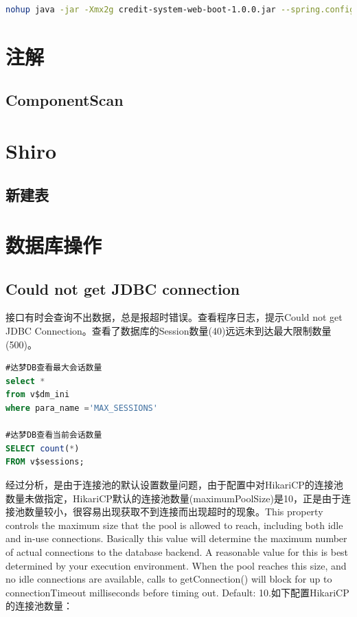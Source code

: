 \documentclass[letter]{book}
\begin{document}
\begin{lstlisting}[language=Bash]
nohup java -jar -Xmx2g credit-system-web-boot-1.0.0.jar --spring.config.location=application-jenkins.properties &
\end{lstlisting}

\section{注解}

\subsection{ComponentScan}

\section{Shiro}

\subsection{新建表}



\section{数据库操作}

\subsection{Could not get JDBC connection}

接口有时会查询不出数据，总是报超时错误。查看程序日志，提示Could not get JDBC Connection。查看了数据库的Session数量(40)远远未到达最大限制数量(500)。

\begin{lstlisting}[language=SQL]
#达梦DB查看最大会话数量
select *
from v$dm_ini
where para_name ='MAX_SESSIONS'

#达梦DB查看当前会话数量
SELECT count(*)
FROM v$sessions;
\end{lstlisting}

经过分析，是由于连接池的默认设置数量问题，由于配置中对HikariCP的连接池数量未做指定，HikariCP默认的连接池数量(maximumPoolSize)是10，正是由于连接池数量较小，很容易出现获取不到连接而出现超时的现象。This property controls the maximum size that the pool is allowed to reach, including both idle and in-use connections. Basically this value will determine the maximum number of actual connections to the database backend. A reasonable value for this is best determined by your execution environment. When the pool reaches this size, and no idle connections are available, calls to getConnection() will block for up to connectionTimeout milliseconds before timing out. Default: 10.如下配置HikariCP的连接池数量：
\end{document}
